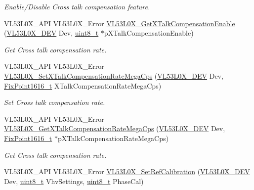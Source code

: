 \begin{DoxyCompactItemize}
\begin{DoxyCompactList}\small\item\em Enable/\+Disable Cross talk compensation feature. \end{DoxyCompactList}\item 
V\+L53\+L0\+X\+\_\+\+A\+PI V\+L53\+L0\+X\+\_\+\+Error \hyperlink{group__VL53L0X__parameters__group_gae0cd0ec86a3dd0270fb57587c49ac822}{V\+L53\+L0\+X\+\_\+\+Get\+X\+Talk\+Compensation\+Enable} (\hyperlink{group__VL53L0X__platform__group_ga2d6405308b1dd524b462f1b8fb97d167}{V\+L53\+L0\+X\+\_\+\+D\+EV} Dev, \hyperlink{vl53l0x__types_8h_aba7bc1797add20fe3efdf37ced1182c5}{uint8\+\_\+t} $\ast$p\+X\+Talk\+Compensation\+Enable)
\begin{DoxyCompactList}\small\item\em Get Cross talk compensation rate. \end{DoxyCompactList}\item 
V\+L53\+L0\+X\+\_\+\+A\+PI V\+L53\+L0\+X\+\_\+\+Error \hyperlink{group__VL53L0X__parameters__group_ga5a9549bdb784e68ef58663c21542f7ad}{V\+L53\+L0\+X\+\_\+\+Set\+X\+Talk\+Compensation\+Rate\+Mega\+Cps} (\hyperlink{group__VL53L0X__platform__group_ga2d6405308b1dd524b462f1b8fb97d167}{V\+L53\+L0\+X\+\_\+\+D\+EV} Dev, \hyperlink{vl53l0x__types_8h_afb910790161809fc76e1a274a6349384}{Fix\+Point1616\+\_\+t} X\+Talk\+Compensation\+Rate\+Mega\+Cps)
\begin{DoxyCompactList}\small\item\em Set Cross talk compensation rate. \end{DoxyCompactList}\item 
V\+L53\+L0\+X\+\_\+\+A\+PI V\+L53\+L0\+X\+\_\+\+Error \hyperlink{group__VL53L0X__parameters__group_ga64f96b1cd03b06e46253d4ff3230bc18}{V\+L53\+L0\+X\+\_\+\+Get\+X\+Talk\+Compensation\+Rate\+Mega\+Cps} (\hyperlink{group__VL53L0X__platform__group_ga2d6405308b1dd524b462f1b8fb97d167}{V\+L53\+L0\+X\+\_\+\+D\+EV} Dev, \hyperlink{vl53l0x__types_8h_afb910790161809fc76e1a274a6349384}{Fix\+Point1616\+\_\+t} $\ast$p\+X\+Talk\+Compensation\+Rate\+Mega\+Cps)
\begin{DoxyCompactList}\small\item\em Get Cross talk compensation rate. \end{DoxyCompactList}\item 
V\+L53\+L0\+X\+\_\+\+A\+PI V\+L53\+L0\+X\+\_\+\+Error \hyperlink{group__VL53L0X__parameters__group_ga83f7b83f76eaed0fdb4ea2034c3a9a21}{V\+L53\+L0\+X\+\_\+\+Set\+Ref\+Calibration} (\hyperlink{group__VL53L0X__platform__group_ga2d6405308b1dd524b462f1b8fb97d167}{V\+L53\+L0\+X\+\_\+\+D\+EV} Dev, \hyperlink{vl53l0x__types_8h_aba7bc1797add20fe3efdf37ced1182c5}{uint8\+\_\+t} Vhv\+Settings, \hyperlink{vl53l0x__types_8h_aba7bc1797add20fe3efdf37ced1182c5}{uint8\+\_\+t} Phase\+Cal)

\end{DoxyCompactItemize}
